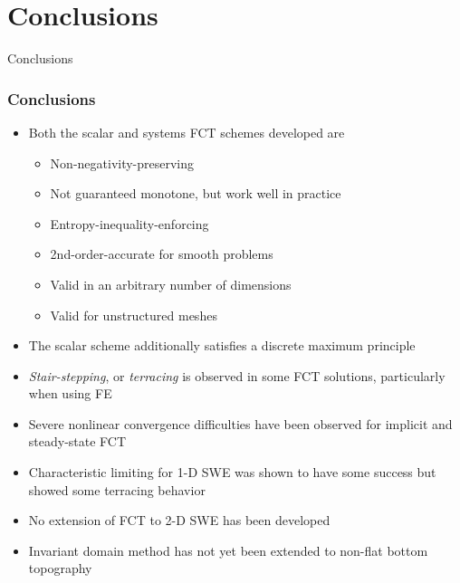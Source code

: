 \section{Conclusions}
\begin{frame}
\begin{center}
  \Huge{\textcolor{myblue}{Conclusions}}
\end{center}
\end{frame}
\begin{frame}
\frametitle{Conclusions}

\begin{itemize}
  \item Both the scalar and systems FCT schemes developed are
    \begin{itemize}
      \item Non-negativity-preserving
      \item Not guaranteed monotone, but work well in practice
      \item Entropy-inequality-enforcing
      \item 2nd-order-accurate for smooth problems
      \item Valid in an arbitrary number of dimensions
      \item Valid for unstructured meshes
    \end{itemize}
  \item The scalar scheme additionally satisfies a discrete maximum principle
  \item \emph{Stair-stepping}, or \emph{terracing} is observed in some
    FCT solutions, particularly when using FE
  \item Severe nonlinear convergence difficulties have been observed for
    implicit and steady-state FCT
  \item Characteristic limiting for 1-D SWE was shown to have some
    success but showed some terracing behavior
  \item No extension of FCT to 2-D SWE has been developed
  \item Invariant domain method has not yet been extended to non-flat
    bottom topography
\end{itemize}

\end{frame}
